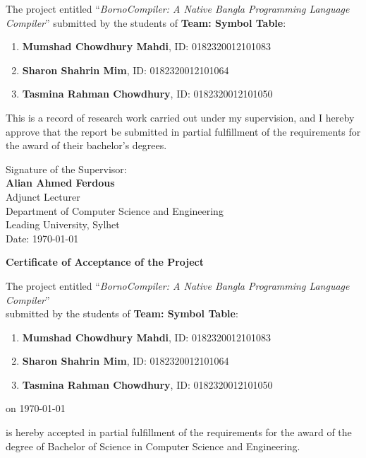 \documentclass[12pt, a4paper]{report}
\begin{document}
\begin{titlepage}
\noindent
The project entitled ``\emph{BornoCompiler: A Native Bangla Programming Language Compiler}'' submitted by the students of \textbf{Team: Symbol Table}:
\begin{enumerate}
    \item \textbf{Mumshad Chowdhury Mahdi}, ID: 0182320012101083
    \item \textbf{Sharon Shahrin Mim}, ID: 0182320012101064
    \item \textbf{Tasmina Rahman Chowdhury}, ID: 0182320012101050
\end{enumerate}
\vspace{0.3cm}
\noindent
This is a record of research work carried out under my supervision, and I hereby approve that the report be submitted in partial fulfillment of the requirements for the award of their bachelor's degrees.

\vspace{7.5cm}
\noindent
Signature of the Supervisor: \\[0.3cm]
\textbf{Alian Ahmed Ferdous}\\
Adjunct Lecturer\\
Department of Computer Science and Engineering\\
Leading University, Sylhet\\[0.15cm]
Date: \today

\newpage
\thispagestyle{empty}
\begin{center}
    \textbf{\huge Certificate of Acceptance of the Project}
\end{center}
\vspace{0.8cm}

\noindent
The project entitled ``\emph{BornoCompiler: A Native Bangla Programming Language Compiler}''\\
submitted by the students of \textbf{Team: Symbol Table}:
\begin{enumerate}
    \item \textbf{Mumshad Chowdhury Mahdi}, ID: 0182320012101083
    \item \textbf{Sharon Shahrin Mim}, ID: 0182320012101064
    \item \textbf{Tasmina Rahman Chowdhury}, ID: 0182320012101050
\end{enumerate}
on \today

\vspace{0.3cm}
\noindent
is hereby accepted in partial fulfillment of the requirements for the award of the degree of Bachelor of Science in Computer Science and Engineering.


\end{titlepage}
\end{document}
